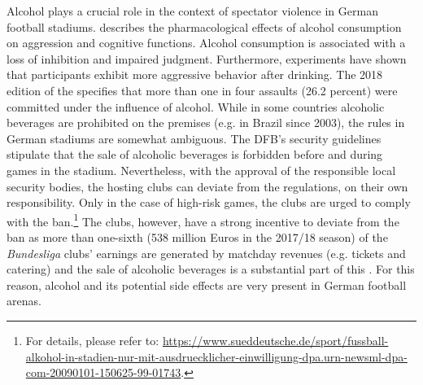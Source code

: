 Alcohol plays a crucial role in the context of spectator violence in German football stadiums. \cite{cook2013virtuous} describes the pharmacological effects of alcohol consumption on aggression and cognitive functions. Alcohol consumption is associated with a loss of inhibition and impaired judgment. Furthermore, experiments have shown that participants exhibit more aggressive behavior after drinking. The 2018 edition of the \citeauthor{PCS2018} specifies that more than one in four assaults (26.2 percent) were committed under the influence of alcohol. While in some countries alcoholic beverages are prohibited on the premises (e.g. in Brazil since 2003), the rules in German stadiums are somewhat ambiguous. The DFB's security guidelines stipulate that the sale of alcoholic beverages is forbidden before and during games in the stadium. Nevertheless, with the approval of the responsible local security bodies, the hosting clubs can deviate from the regulations, on their own responsibility. Only in the case of high-risk games, the clubs are urged to comply with the ban.\footnote{For details, please refer to: \href{https://www.sueddeutsche.de/sport/fussball-alkohol-in-stadien-nur-mit-ausdruecklicher-einwilligung-dpa.urn-newsml-dpa-com-20090101-150625-99-01743}{https://www.sueddeutsche.de/sport/fussball-alkohol-in-stadien-nur-mit-ausdruecklicher-einwilligung-dpa.urn-newsml-dpa-com-20090101-150625-99-01743}.} The clubs, however, have a strong incentive to deviate from the ban as more than one-sixth (538 million Euros in the 2017/18 season) of the \textit{Bundesliga} clubs' earnings are generated by matchday revenues (e.g. tickets and catering) and the sale of alcoholic beverages is a substantial part of this \citep{deloitte2019report}. For this reason, alcohol and its potential side effects are very present in German football arenas.


